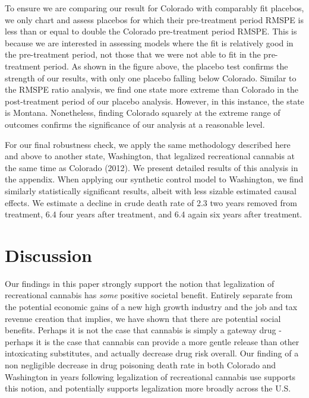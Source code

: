 \documentclass{article}
\begin{document}
To ensure we are comparing our result for Colorado with comparably fit placebos, we only chart and assess placebos for which their pre-treatment period RMSPE is less than or equal to double the Colorado pre-treatment period RMSPE. This is because we are interested in assessing models where the fit is relatively good in the pre-treatment period, not those that we were not able to fit in the pre-treatment period. As shown in the figure above, the placebo test confirms the strength of our results, with only one placebo falling below Colorado. Similar to the RMSPE ratio analysis, we find one state more extreme than Colorado in the post-treatment period of our placebo analysis. However, in this instance, the state is Montana. Nonetheless, finding Colorado squarely at the extreme range of outcomes confirms the significance of our analysis at a reasonable level.

For our final robustness check, we apply the same methodology described here and above to another state, Washington, that legalized recreational cannabis at the same time as Colorado (2012). We present detailed results of this analysis in the appendix. When applying our synthetic control model to Washington, we find similarly statistically significant results, albeit with less sizable estimated causal effects. We estimate a decline in crude death rate of 2.3 two years removed from treatment, 6.4 four years after treatment, and 6.4 again six years after treatment. 

\section{Discussion}

Our findings in this paper strongly support the notion that legalization of recreational cannabis has \emph{some} positive societal benefit. Entirely separate from the potential economic gains of a new high growth industry and the job and tax revenue creation that implies, we have shown that there are potential social benefits. Perhaps it is not the case that cannabis is simply a gateway drug - perhaps it is the case that cannabis can provide a more gentle release than other intoxicating substitutes, and actually decrease drug risk overall. Our finding of a non negligible decrease in drug poisoning death rate in both Colorado and Washington in years following legalization of recreational cannabis use supports this notion, and potentially supports legalization more broadly across the U.S.
\end{document}
